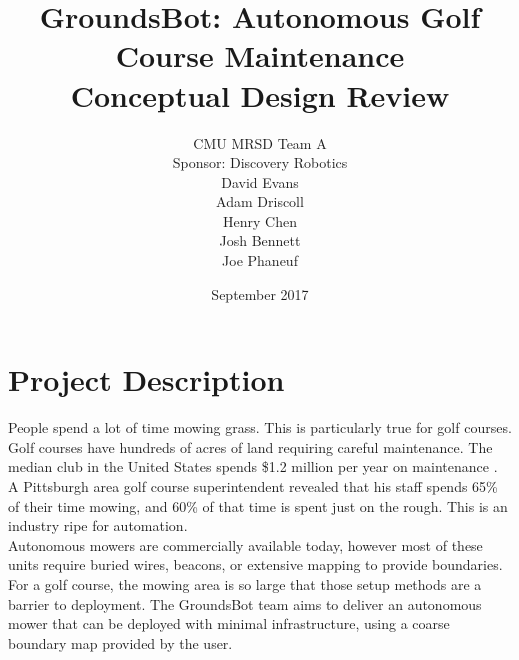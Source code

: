 \documentclass[12pt]{extarticle}
\begin{document}


\title{GroundsBot: Autonomous Golf Course Maintenance \\[.5ex]
		\Large Conceptual Design Review}
\date{September 2017}
\author{CMU MRSD Team A        \\ Sponsor: Discovery Robotics \\ David Evans \\
        Adam Driscoll \\ Henry Chen  \\
        Josh Bennett  \\ Joe Phaneuf \\ }

\maketitle
\def\svgwidth{\columnwidth}

\newpage

\begin{spacing}{0.95}
\tableofcontents
\end{spacing}

\newpage

\newpage
\section{Project Description}

People spend a lot of time mowing grass. This is particularly true for golf courses. Golf courses have hundreds of acres of land requiring careful maintenance. The median club in the United States spends \$1.2 million per year on maintenance \cite{clubbenchmarking}. A Pittsburgh area golf course superintendent \cite{interview-duxbury} revealed that his staff spends 65\% of their time mowing, and 60\% of that time is spent just on the rough. This is an industry ripe for automation.
\\

Autonomous mowers are commercially available today, however most of these units require buried wires, beacons, or extensive mapping to provide boundaries. For a golf course, the mowing area is so large that those setup methods are a barrier to deployment. The GroundsBot team aims to deliver an autonomous mower that can be deployed with minimal infrastructure, using a coarse boundary map provided by the user.
\end{document}
